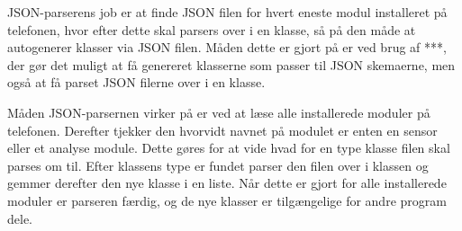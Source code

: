 JSON-parserens job er at finde JSON filen for hvert eneste modul installeret på telefonen, hvor efter dette skal parsers over i en klasse, så på den måde at autogenerer klasser via JSON filen.
Måden dette er gjort på er ved brug af ***, der gør det muligt at få genereret klasserne som passer til JSON skemaerne, men også at få parset JSON filerne over i en klasse. 

Måden JSON-parsernen virker på er ved at læse alle installerede moduler på telefonen.
Derefter tjekker den hvorvidt navnet på modulet er enten en sensor eller et analyse module.
Dette gøres for at vide hvad for en type klasse filen skal parses om til.
Efter klassens type er fundet parser den filen over i klassen og gemmer derefter den nye klasse i en liste.
Når dette er gjort for alle installerede moduler er parseren færdig, og de nye klasser er tilgængelige for andre program dele.